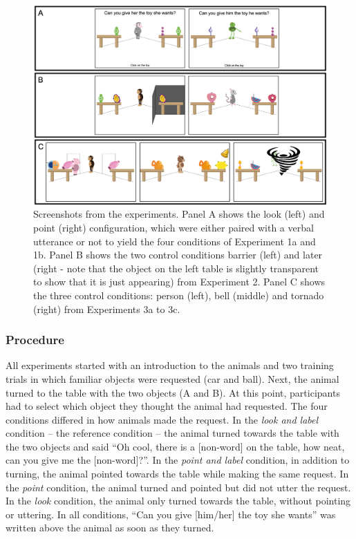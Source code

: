 \documentclass[
  man,floatsintext]{apa6}
\begin{document}
\begin{figure}

{\centering \includegraphics[width=1\linewidth]{../figures/fig1} 

}

\caption{Screenshots from the experiments. Panel A shows the look (left) and point (right) configuration, which were either paired with a verbal utterance or not to yield the four conditions of Experiment 1a and 1b. Panel B shows the two control conditions barrier (left) and later (right - note that the object on the left table is slightly transparent to show that it is just appearing) from Experiment 2. Panel C shows the three control conditions: person (left), bell (middle) and tornado (right) from Experiments 3a to 3c.}\label{fig:fig1}
\end{figure}

\hypertarget{procedure}{%
\subsubsection{Procedure}\label{procedure}}

All experiments started with an introduction to the animals and two training trials in which familiar objects were requested (car and ball). Next, the animal turned to the table with the two objects (A and B). At this point, participants had to select which object they thought the animal had requested. The four conditions differed in how animals made the request. In the \emph{look and label} condition -- the reference condition -- the animal turned towards the table with the two objects and said ``Oh cool, there is a {[}non-word{]} on the table, how neat, can you give me the {[}non-word{]}?''. In the \emph{point and label} condition, in addition to turning, the animal pointed towards the table while making the same request. In the \emph{point} condition, the animal turned and pointed but did not utter the request. In the \emph{look} condition, the animal only turned towards the table, without pointing or uttering. In all conditions, ``Can you give {[}him/her{]} the toy she wants'' was written above the animal as soon as they turned.
\end{document}
